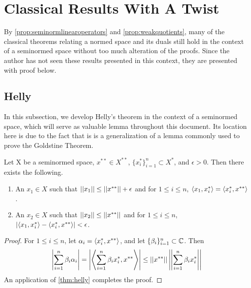 
\section{Classical Results With A Twist}

By \ref{prop:seminormlinearoperators} and \ref{prop:weakquotients}, many of the classical theorems relating a normed space and its duals still hold in the context of a seminormed space without too much alteration of the proofs. Since the author has not seen these results presented in this context, they are presented with proof below. 
\subsection{Helly}
In this subsection, we develop Helly's theorem in the context of a seminormed space, which will serve as valuable lemma throughout this document. Its location here is due to the fact that  is is a generalization of a lemma commonly used to prove the Goldstine Theorem. 

\begin{cor}
    \label{cor:helly}
    Let X be a seminormed space, $x^{**} \in X^{**}$, $\{x_i^*\}_{i=1}^n \subset X^*$, and $\epsilon > 0$. Then there exists the following.
    \begin{enumerate}
        \item An $x_1 \in X$ such that $\left|\left| x_1 \right|\right| \leq \left|\left| x^{**} \right|\right|+\epsilon$ and for $1 \leq i \leq n$, $\left\langle x_1,x_i^* \right\rangle = \left\langle x_i^*,x^{**} \right\rangle$.  
        \item An $x_2 \in X$ such that $\left|\left| x_2 \right|\right| \leq \left|\left| x^{**} \right|\right|$ and for $1 \leq i \leq n$, $\left| \left\langle x_1,x_i^* \right\rangle-\left\langle x_i^*,x^{**} \right\rangle \right| < \epsilon$. 
    \end{enumerate} 
    \begin{proof} For $1 \leq i \leq n$, let $\alpha_i=\left\langle x_i^*,x^{**} \right\rangle$, and let $\{\beta_i\}_{i=1}^n \subset \mathbb{C}$. Then 
        \begin{equation}
            \left| \sum_{i=1}^n \beta_i \alpha_i \right| = \left|  \left\langle \sum_{i=1}^n \beta_i x_i^*,x^{**} \right\rangle \right| \leq \left|\left| x^{**} \right|\right| \left|\left| \sum_{i=1}^n \beta_i x_i^* \right|\right|
        \end{equation}
        An application of \ref{thm:helly} completes the proof. 
    \end{proof} 
\end{cor} 
